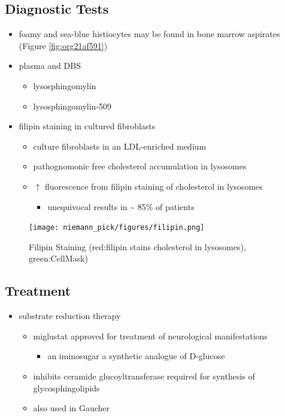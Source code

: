 \documentclass[12pt]{scrartcl}
\begin{document}
\subsection{Diagnostic Tests}
\label{sec:orgab88a3c}
\begin{itemize}
\item foamy and sea-blue histiocytes may be found in bone marrow aspirates
(Figure \ref{fig:org21af591})
\item plasma and DBS
\begin{itemize}
\item lysosphingomylin
\item lysosphingomylin-509
\end{itemize}
\item filipin staining in cultured fibroblasts
\begin{itemize}
\item culture fibroblasts in an LDL-enriched medium
\item pathognomonic free cholesterol accumulation in lysosomes
\item \(\uparrow\) fluorescence from filipin staining of cholesterol in lysosomes 
\begin{itemize}
\item unequivocal results in \textasciitilde{} 85\% of patients
\end{itemize}
\end{itemize}
\end{itemize}


\begin{figure}[htbp]
\centering
\texttt{[image: niemann\_pick/figures/filipin.png]}
\caption{\label{fig:orgf9599ec}Filipin Staining (red:filipin stains cholesterol in lysosomes), green:CellMask)}
\end{figure}

\subsection{Treatment}
\label{sec:orgb81df80}
\begin{itemize}
\item substrate reduction therapy
\begin{itemize}
\item miglustat approved for treatment of neurological manifestations
\begin{itemize}
\item an iminosugar a synthetic analogue of D-glucose
\end{itemize}
\item inhibits ceramide glucoyltransferase required for synthesis of
glycosphingolipids
\item also used in Gaucher
\end{itemize}
\end{itemize}
\end{document}
